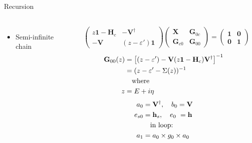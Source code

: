\documentclass[hyperref={colorlinks=true,urlcolor=blue,linkcolor=.},aspectratio=1610,mathserif]{beamer}
\begin{document}
\begin{frame}{Recursion}
	\begin{overprint}
		\begin{center}
			\begin{columns}[c]
				\begin{itemize}
					\item Semi-infinite chain
				\end{itemize}
				\begin{align*}
					 & \begin{pmatrix}
						z\mathbf{1}-\mathbf{H}_c & -\mathbf{V}^{\dagger} \\ -\mathbf{V} & (z-\varepsilon')\mathbf{1}
					\end{pmatrix}
					\begin{pmatrix}
						\mathbf{X}      & \mathbf{G}_{0c} \\
						\mathbf{G}_{c0} & \mathbf{G}_{00}
					\end{pmatrix}
					=
					\begin{pmatrix}
						\mathbf{1} & \mathbf{0} \\
						\mathbf{0} & \mathbf{1}
					\end{pmatrix}
				\end{align*}
				\begin{align*}
					\mathbf{G}_{00}(z) & = \left[(z-\varepsilon')-\vb{V}(z\vb{1}-\vb{H}_c)\vb{V}^{\dagger}\right]^{-1} \\
					                   & = (z-\varepsilon'-\Sigma(z))^{-1}                                             \\
					                   & \qq{where}                                                                    \\
					z                  & = E+i\eta                                                                     \\
				\end{align*}
				\begin{align*}
					a_0           & = \vb{V}^{\dagger}, \quad b_0 = \vb{V}                        \\
					e_{s0}        & = \vb{h}_s, \quad e_0\ = \vb{h}                               \\
					              & \qq{in loop:}                                                 \\
					a_1           & = a_0 \times g_0 \times a_0                                   \\

\end{align*}
\end{columns}
\end{center}
\end{overprint}
\end{frame}
\end{document}
